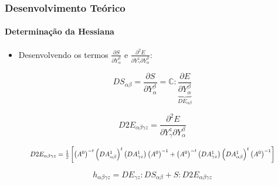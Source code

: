 \documentclass{beamer}
\begin{document}
\begin{frame}
    \frametitle{Desenvolvimento Teórico}
    \framesubtitle{Determinação da Hessiana}

    \begin{itemize}
        \item Desenvolvendo os termos \(\frac{\partial S}{\partial Y_\alpha^\beta}\) e \(\frac{\partial^2 E}{\partial Y_\gamma^z \partial Y^\beta_\alpha}\):
    \end{itemize}

    \begin{equation}
        DS_{\alpha\beta} = \frac{\partial S}{\partial Y_\alpha^\beta} = \mathbb{C} : \underbrace{\frac{\partial E}{\partial Y_\alpha^\beta}}_{DE_{\alpha\beta} }  
    \end{equation}


    \begin{equation}
        D2E_{\alpha\beta\gamma z} = \frac{\partial^2 E}{\partial Y_\gamma^z \partial Y^\beta_\alpha}  
    \end{equation}

    \begin{equation}
        \scalebox{0.8}{$
        D2E_{\alpha\beta\gamma z}
        =
        \frac{1}{2} \left[
        \left(A^0\right)^{-t} \left(DA^1_{\alpha\beta}\right)^t \left(DA^1_{\gamma z}\right)  \left(A^0\right)^{-1 }
        +\left(A^0\right)^{-t} \left(DA^1_{\gamma z}\right)\left(DA^1_{\alpha\beta}\right)^t  \left(A^0\right)^{-1}
        \right]
        $}
    \end{equation}

    \begin{equation}
        h_{\alpha\beta\gamma z} = DE_{\gamma z} : DS_{\alpha\beta} + S : D2E_{\alpha\beta\gamma z}
    \end{equation}

\end{frame}
\end{document}
